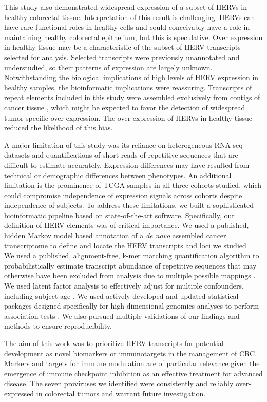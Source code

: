 This study also demonstrated widespread expression of a subset of HERVs in healthy colorectal tissue.
Interpretation of this result is challenging.
HERVs can have rare functional roles in healthy cells \citep{Rote2004} and could conceivably have a role in maintaining healthy colorectal epithelium, but this is speculative.
Over expression in healthy tissue may be a characteristic of the subset of HERV transcripts selected for analysis.
Selected transcripts were previously unannotated and understudied, so their patterns of expression are largely unknown.
Notwithstanding the biological implications of high levels of HERV expression in healthy samples, the bioinformatic implications were reassuring.
Transcripts of repeat elements included in this study were assembled exclusively from contigs of cancer tissue \citep{Attig2019}, which might be expected to favor the detection of widespread tumor specific over-expression.
The over-expression of HERVs in healthy tissue reduced the likelihood of this bias.

A major limitation of this study was its reliance on heterogeneous RNA-seq datasets and quantifications of short reads of repetitive sequences that are difficult to estimate accurately.
Expression differences may have resulted from technical or demographic differences between phenotypes.
An additional limitation is the prominence of TCGA samples in all three cohorts studied, which could compromise independence of expression signals across cohorts despite independence of subjects.
To address these limitations, we built a sophisticated bioinformatic pipeline based on state-of-the-art software.
Specifically, our definition of HERV elements was of critical importance.
We used a published, hidden Markov model based annotation of a \emph{de novo} assembled cancer transcriptome to define and locate the HERV transcripts and loci we studied \citep{Attig2019}.
We used a published, alignment-free, k-mer matching quantification algorithm to probabilistically estimate transcript abundance of repetitive sequences that may otherwise have been excluded from analysis due to multiple possible mappings \citep{Patro2017}.
We used latent factor analysis to effectively adjust for multiple confounders, including subject age \citep{sva}.
We used actively developed and updated statistical packages designed specifically for high dimensional genomics analyses to perform association tests \citep{Love2014, sva}.
We also pursued multiple validations of our findings and methods to ensure reproducibility.

The aim of this work was to prioritize HERV transcripts for potential development as novel biomarkers or immunotargets in the management of CRC.
Markers and targets for immune modulation are of particular relevance given the emergence of immune checkpoint inhibition as an effective treatment for advanced disease.
The seven proviruses we identified were consistently and reliably over-expressed in colorectal tumors and warrant future investigation.
